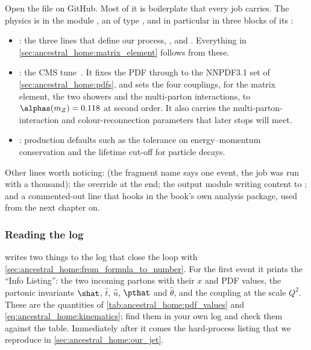 Open the file on GitHub. Most of it is boilerplate that every \CMSSW job
carries. The physics is in the module , an
 of type , and in
particular in three blocks of its :
\begin{itemize}[nosep]
  \item {}: the three lines that define our process,
    ,  and
    . Everything in
    \cref{sec:ancestral_home:matrix_element} follows from these.
  \item {}: the CMS tune~\cite{CMS:2019csb}. It fixes
    the PDF through  to the NNPDF3.1 set of
    \cref{sec:ancestral_home:pdfs}, and sets the four couplings, for the matrix
    element, the two showers and the multi-parton interactions, to
    $\alphas(m_Z)=0.118$ at second order. It also carries the
    multi-parton-interaction and colour-reconnection parameters that later
    stops will meet.
  \item {}: production defaults such as the
    tolerance on energy--momentum conservation and the lifetime cut-off for
    particle decays.
\end{itemize}
Other lines worth noticing:  (the fragment
name says one event, the job was run with a thousand); the
 override at the end; the output module writing
 content to ; and a commented-out
 line that hooks in the book's own analysis package,
used from the next chapter on.

\subsubsection{Reading the log}

\PYTHIA writes two things to the log that close the loop with
\cref{sec:ancestral_home:from_formula_to_number}. For the first event it
prints the ``Info Listing'': the two incoming partons with their $x$ and
PDF values, the partonic invariants $\shat$, $\hat t$, $\hat u$, $\pthat$
and $\hat\theta$, and the coupling at the scale $Q^2$. These are the
quantities of \cref{tab:ancestral_home:pdf_values} and
\cref{eq:ancestral_home:kinematics}; find them in your own log and check
them against the table. Immediately after it comes the hard-process listing
that we reproduce in \cref{sec:ancestral_home:our_jet}.


